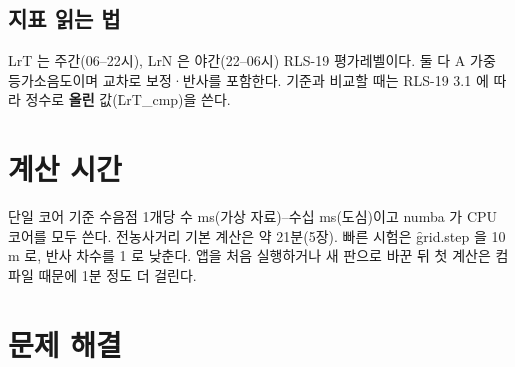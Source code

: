 \documentclass[10.5pt,a4paper]{article}
\begin{document}
\subsection{지표 읽는 법}
LrT 는 주간(06–22시), LrN 은 야간(22–06시) RLS-19 평가레벨이다. 둘 다 A 가중 등가소음도이며 교차로 보정·반사를 포함한다. 기준과 비교할 때는 RLS-19 3.1 에 따라 정수로 \textbf{올린} 값(\f{LrT\_cmp})을 쓴다.

\section{계산 시간}
단일 코어 기준 수음점 1개당 수 ms(가상 자료)–수십 ms(도심)이고 numba 가 CPU 코어를 모두 쓴다. 전농사거리 기본 계산은 약 21분(5장). 빠른 시험은 \f{grid.step} 을 10 m 로, 반사 차수를 1 로 낮춘다. 앱을 처음 실행하거나 새 판으로 바꾼 뒤 첫 계산은 컴파일 때문에 1분 정도 더 걸린다.

\section{문제 해결}
\end{document}
